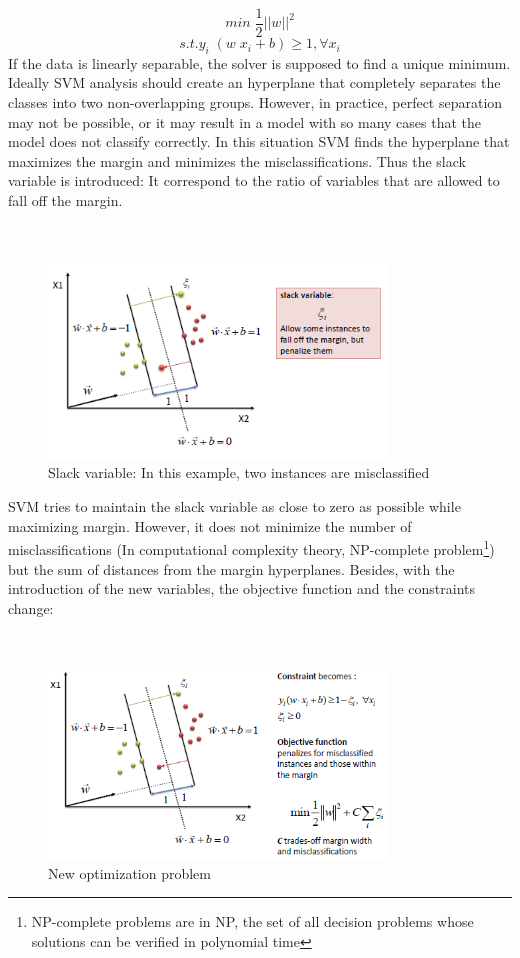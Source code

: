 \begin{equation*}
min \; \frac{1}{2} ||w||^2 
\end{equation*}
\begin{equation*}
s.t. y_i \; (w \; x_i + b) \geq 1, \forall x_i
\end{equation*}
If the data is linearly separable, the solver is supposed to find a unique minimum. Ideally SVM analysis should create an hyperplane that completely separates the classes into two non-overlapping groups. However, in practice, perfect separation may not be possible, or it may result in a model with so many cases that the model does not classify correctly. In this situation SVM finds the hyperplane that maximizes the margin and minimizes the misclassifications. Thus the slack variable is introduced: It correspond to the ratio of variables that are allowed to fall off the margin.

\
\begin{figure}[H]
    \centering
    \includegraphics[width=0.8\textwidth]{fig/svm-slack.png}
    \caption[Short caption]{Slack variable: In this example, two instances are misclassified}
    \label{fig:svm-slack}
\end{figure}

SVM tries to maintain the slack variable as close to zero as possible while maximizing margin. However, it does not minimize the number of misclassifications (In computational complexity theory, NP-complete problem\footnote{NP-complete problems are in NP, the set of all decision problems whose solutions can be verified in polynomial time}) but the sum of distances from the margin hyperplanes. Besides, with the introduction of the new variables, the objective function and the constraints change:

\
\begin{figure}[H]
    \centering
    \includegraphics[width=0.8\textwidth]{fig/svm-C.png}
    \caption[Short caption]{New optimization problem}
    \label{fig:svm-C}
\end{figure}

